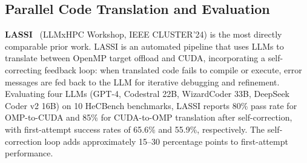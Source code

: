 \documentclass[conference]{IEEEtran}
\begin{document}


\subsection{Parallel Code Translation and Evaluation}
\label{sec:parallel-translation}

\textbf{LASSI}~\cite{LASSI2024} (LLMxHPC Workshop, IEEE CLUSTER'24) is the most directly comparable prior work. LASSI is an automated pipeline that uses LLMs to translate between OpenMP target offload and CUDA, incorporating a self-correcting feedback loop: when translated code fails to compile or execute, error messages are fed back to the LLM for iterative debugging and refinement. Evaluating four LLMs (GPT-4, Codestral 22B, WizardCoder 33B, DeepSeek Coder v2 16B) on 10 HeCBench benchmarks, LASSI reports 80\% pass rate for OMP-to-CUDA and 85\% for CUDA-to-OMP translation after self-correction, with first-attempt success rates of 65.6\% and 55.9\%, respectively. The self-correction loop adds approximately 15--30 percentage points to first-attempt performance.
\end{document}
